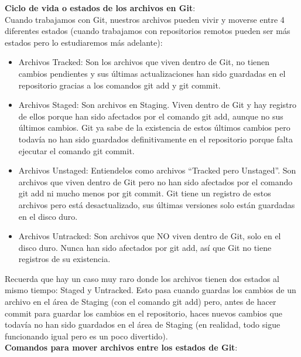 \documentclass{article}
\begin{document}
\textbf{Ciclo de vida o estados de los archivos en Git}:\\

Cuando trabajamos con Git, nuestros archivos pueden vivir y moverse entre 4
diferentes estados (cuando trabajamos con repositorios remotos pueden ser más
estados pero lo estudiaremos más adelante):\\

\begin{itemize}
  \item Archivos Tracked: Son los archivos que viven dentro de Git, no tienen
    cambios pendientes y sus últimas actualizaciones han sido guardadas en el
    repositorio gracias a los comandos git add y git commit.
  \item Archivos Staged: Son archivos en Staging. Viven dentro de Git y hay
    registro de ellos porque han sido afectados por el comando git add, aunque
    no sus últimos cambios. Git ya sabe de la existencia de estos últimos
    cambios pero todavía no han sido guardados definitivamente en el
    repositorio porque falta ejecutar el comando git commit.
  \item Archivos Unstaged: Entiendelos como archivos “Tracked pero Unstaged”.
    Son archivos que viven dentro de Git pero no han sido afectados por el
    comando git add ni mucho menos por git commit. Git tiene un registro de
    estos archivos pero está desactualizado, sus últimas versiones solo están
    guardadas en el disco duro.
  \item Archivos Untracked: Son archivos que NO viven dentro de Git, solo en el
    disco duro. Nunca han sido afectados por git add, así que Git no tiene
    registros de su existencia.
\end{itemize}

Recuerda que hay un caso muy raro donde los archivos tienen dos estados al
mismo tiempo: Staged y Untracked. Esto pasa cuando guardas los cambios de un
archivo en el área de Staging (con el comando git add) pero, antes de hacer
commit para guardar los cambios en el repositorio, haces nuevos cambios que
todavía no han sido guardados en el área de Staging (en realidad, todo sigue
funcionando igual pero es un poco divertido).\\

\textbf{Comandos para mover archivos entre los estados de Git}:\\
\end{document}
